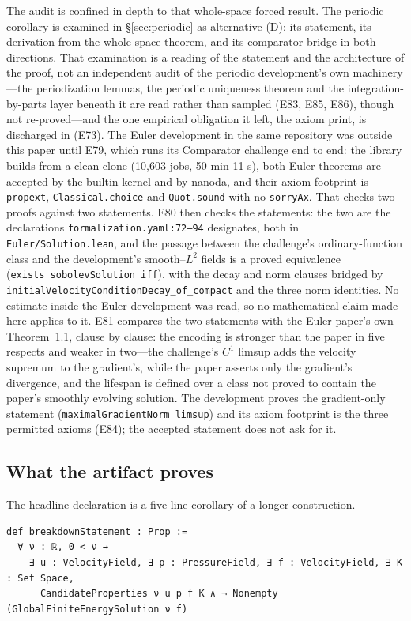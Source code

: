\documentclass[11pt]{article}
\newcommand{\ct}[1]{\texttt{#1}}
\newcommand{\file}[1]{\texttt{\small #1}}
\theoremstyle{plain}
\theoremstyle{definition}
\theoremstyle{remark}
\begin{document}
The audit is confined in depth to that whole-space forced result. The periodic
corollary is examined in \S\ref{sec:periodic} as alternative (D): its statement,
its derivation from the whole-space theorem, and its comparator bridge in both
directions. That examination is a reading of the statement and the architecture
of the proof, not an independent audit of the periodic development's own
machinery---the periodization lemmas, the periodic uniqueness theorem and the integration-by-parts layer beneath it are read rather than sampled (E83, E85, E86), though not re-proved---and the one empirical obligation it left, the axiom print, is
discharged in (E73). The Euler development in the same repository was outside
this paper until E79, which runs its Comparator challenge end to end: the
library builds from a clean clone (10,603 jobs, 50 min 11 s), both Euler
theorems are accepted by the builtin kernel and by nanoda, and their axiom
footprint is \ct{propext}, \ct{Classical.choice} and \ct{Quot.sound} with no
\ct{sorryAx}. That checks two proofs against two statements. E80 then checks the statements: the two are the declarations
\file{formalization.yaml:72--94} designates, both in \file{Euler/Solution.lean},
and the passage between the challenge's ordinary-function class and the
development's smooth--$L^2$ fields is a proved equivalence
(\ct{exists\_sobolevSolution\_iff}), with the decay and norm clauses bridged by
\ct{initialVelocityConditionDecay\_of\_compact} and the three norm identities.
No estimate inside the Euler development was read, so no mathematical claim
made here applies to it. E81 compares the two statements with the Euler paper's
own Theorem~1.1, clause by clause: the encoding is stronger than the paper in
five respects and weaker in two---the challenge's $C^1$ limsup adds the velocity
supremum to the gradient's, while the paper asserts only the gradient's
divergence, and the lifespan is defined over a class not proved to contain the
paper's smoothly evolving solution. The development proves the gradient-only
statement (\ct{maximalGradientNorm\_limsup}) and its axiom footprint is the three
permitted axioms (E84); the accepted statement does not ask for it.

\subsection{What the artifact proves}

The headline declaration is a five-line corollary of a longer construction.

\begin{lstlisting}[caption={(\file{NavierStokes/R3/ProblemStatement.lean:150}) The
statement the repository calls \ct{breakdownStatement}.},label={lst:breakdown}]
def breakdownStatement : Prop :=
  ∀ ν : ℝ, 0 < ν →
    ∃ u : VelocityField, ∃ p : PressureField, ∃ f : VelocityField, ∃ K : Set Space,
      CandidateProperties ν u p f K ∧ ¬ Nonempty (GlobalFiniteEnergySolution ν f)
\end{lstlisting}
\end{document}
